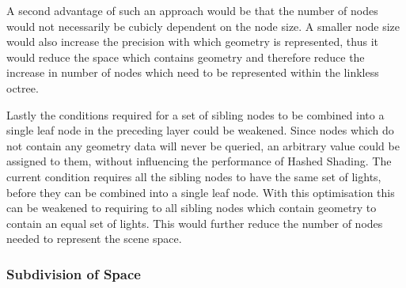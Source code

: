 A second advantage of such an approach would be that the number of nodes would not necessarily
be cubicly dependent on the node size. A smaller node size would also increase the precision
with which geometry is represented, thus it would reduce the space which contains geometry and
therefore reduce the increase in number of nodes which need to be represented within the linkless
octree.



Lastly the conditions required for a set of sibling nodes to be combined into a single
leaf node in the preceding layer could be weakened. Since nodes which do not contain any
geometry data will never be queried, an arbitrary value could be assigned to them, without
influencing the performance of Hashed Shading. The current condition requires all the sibling
nodes to have the same set of lights, before they can be combined into a single leaf node. With
this optimisation this can be weakened to requiring to all sibling nodes which contain geometry
to contain an equal set of lights. This would further reduce the number of nodes
needed to represent the scene space.

\subsubsection{Subdivision of Space}

